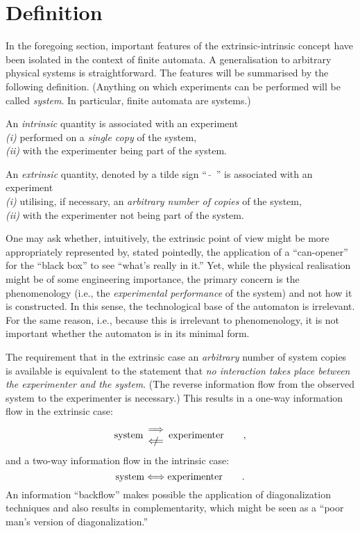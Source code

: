 \documentclass{article}
\begin{document}
 \section{Definition}

 In the foregoing section, important features of the
 extrinsic-intrinsic concept have been isolated in the context of
finite automata. A generalisation to arbitrary physical systems is
straightforward. The features will be
 summarised by the following definition.
 (Anything
 on which experiments can be performed
 will be called {\em system}. In particular, finite automata are
 systems.)

 An {\em intrinsic} quantity is
 associated
 with an experiment\\ {\it (i)} performed on a {\em single copy} of
 the system, \\ {\it (ii)} with the experimenter being part of
 the system.

 An {\em extrinsic}
 quantity, denoted by a tilde sign ``$\widetilde{\quad}$'' is
 associated with an experiment \\ {\it (i)}
 utilising, if necessary, an {\em arbitrary number of copies} of
 the system,
 \\
 {\it (ii)}
 with the experimenter not being part of the system.




 One may  ask whether, intuitively, the extrinsic point of
 view might be
 more appropriately represented by, stated pointedly,  the application
 of a ``can-opener''
 for the ``black box'' to see
 ``what's really in it.''
 Yet, while the physical realisation might be of some engineering
 importance, the primary concern is the
 phenomenology (i.e., the {\em experimental performance} of the
 system) and not how it is constructed.
 In this sense, the technological base of the automaton is
 irrelevant.
 For the same reason, i.e., because this is irrelevant to
 phenomenology, it is not important whether the automaton is in its
 minimal form.

 The requirement that in the extrinsic case an {\em arbitrary} number of
 system copies is available is equivalent to the statement that {\em no
 interaction takes place between the experimenter and the system}. (The
 reverse information flow from the observed system to the experimenter
 is necessary.)
This results in a one-way information flow
 in the extrinsic case:
   \def\A{\hbox{$\; \;$\rlap{/}\kern-.60em $\Longleftarrow$}}
$$
 {\rm system}
 \begin{array}{c}\Longrightarrow\\ \A\end{array}
{\rm  experimenter}   \qquad ,
$$
and a two-way information flow
in the intrinsic case:
$$
 {\rm system}
\Longleftrightarrow
{\rm  experimenter}   \qquad .
$$
An information
``backflow'' makes possible the application of
diagonalization techniques
  and also results in complementarity, which might be seen as a ``poor
man's version of diagonalization.''
\end{document}

